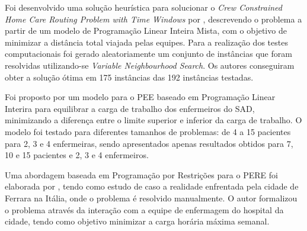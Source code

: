 

Foi desenvolvido uma solução heurística para solucionar o \textit{Crew Constrained Home Care Routing Problem with Time Windows} por \cite{tozlu:2016}, descrevendo o problema a partir de um modelo de Programação Linear Inteira Mista, com o objetivo de minimizar a distância total viajada pelas equipes. Para a realização dos testes computacionais foi gerado aleatoriamente um conjunto de instâncias que foram  resolvidas utilizando-se \textit{Variable Neighbourhood Search}. Os autores conseguiram obter a solução ótima em 175 instâncias das 192 instâncias testadas.

Foi proposto por \cite{trabelsi:2012} um modelo para o \ac{PEE} baseado em Programação Linear Interira para  equilibrar a carga de trabalho dos enfermeiros do \ac{SAD},  minimizando a diferença entre o limite superior e inferior da carga de trabalho. O modelo foi testado para diferentes tamanhos de problemas: de 4 a 15 pacientes para 2, 3 e 4 enfermeiras, sendo apresentados apenas resultados obtidos para 7, 10 e 15 pacientes e 2, 3 e 4 enfermeiros.

Uma abordagem baseada em Programação por Restrições para o \ac{PERE} foi elaborada por \cite{cattafi:2012}, tendo como estudo de caso a realidade enfrentada pela cidade de Ferrara na Itália, onde o problema é resolvido manualmente. O autor formalizou o problema através da interação com a equipe de enfermagem do hospital da cidade, tendo como objetivo minimizar a carga horária máxima semanal.%

